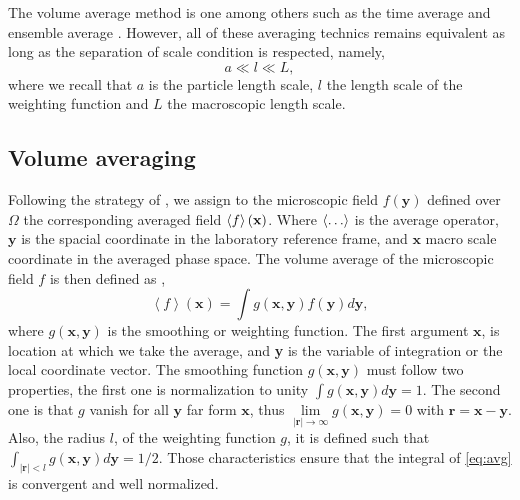 The volume average method is one among others such as the time average \citep{ishii2010thermo} and ensemble average \citep{zhang1994averaged}. 
However, all of these averaging technics remains equivalent \citep{jackson1997locally} as long as the separation of scale condition is respected, namely,
\begin{equation*}
    a \ll l \ll L,
\end{equation*}
where we recall that $a$ is the particle length scale, $l$ the length scale of the weighting function and $L$ the macroscopic length scale.

\subsection{Volume averaging}
Following  the strategy of \citet{jackson1997locally},  we assign to the microscopic field $f(\textbf{y})$ defined over $\Omega$ the corresponding averaged field $\left<f\right>(\textbf{x})$. 
Where $\left<\ldots\right>$ is the average operator, $\textbf{y}$ is the spacial coordinate in the laboratory reference frame,
and $\textbf{x}$ macro scale coordinate in the averaged phase space.
The volume average of the microscopic field $f$ is then defined as \citep{nott2011suspension,jackson1997locally,marle1982macroscopic},
\begin{equation}
    \left<f\right>(\textbf{x}) = \int g(\textbf{x},\textbf{y}) f(\textbf{y})d \textbf{y},
    \label{eq:avg}
\end{equation}
where $g(\textbf{x},\textbf{y})$ is the smoothing or weighting function.
The first argument $\textbf{x}$, is location at which we take the average, and \textbf{y} is the variable of integration or the local coordinate vector.
The smoothing function $g(\textbf{x},\textbf{y})$ must follow two properties, the first one is normalization to unity
$\int g(\textbf{x},\textbf{y}) d\textbf{y} = 1$.
The second one is that $g$ vanish for all $\textbf{y}$ far form $\textbf{x}$, thus $\lim\limits_{|\textbf{r}| \to \infty} g(\textbf{x},\textbf{y}) = 0$ with $\textbf{r} = \textbf{x} - \textbf{y}$.
Also, the radius $l$, of the weighting function $g$, it is defined such that $\int_{|\textbf{r}|<l} g(\textbf{x},\textbf{y})d\textbf{y} = 1/2$.
Those characteristics ensure that the integral of \ref{eq:avg} is convergent and well normalized. 

